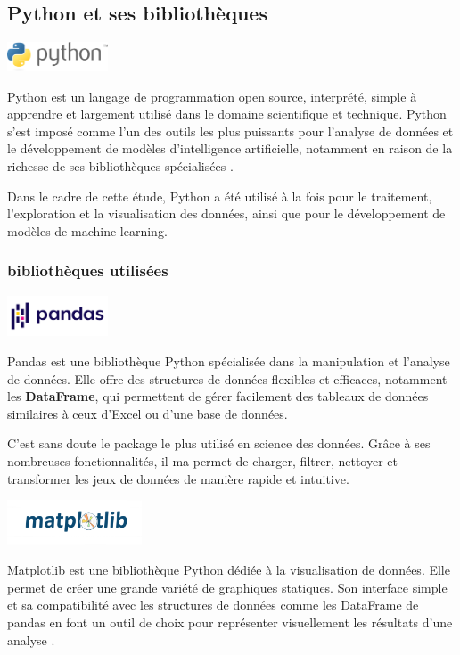 \subsection{Python et ses bibliothèques }

\includegraphics[width=3cm]{images/python.png}

Python est un langage de programmation open source, interprété, 
simple à apprendre et largement utilisé dans le domaine scientifique et technique.
Python s’est imposé comme l’un des outils les plus puissants pour l’analyse de données et le développement de modèles d’intelligence artificielle, 
notamment en raison de la richesse de ses bibliothèques spécialisées \cite{python}.

Dans le cadre de cette étude, Python a été utilisé à la fois pour le traitement, l’exploration et la visualisation des données,
ainsi que pour le développement de modèles de machine learning.

\subsubsection{bibliothèques utilisées}

\includegraphics[width=3cm]{images/Pandas_logo.png}

Pandas est une bibliothèque Python spécialisée dans la manipulation et l’analyse de données. 
Elle offre des structures de données flexibles et efficaces, notamment les \textbf{DataFrame}, 
qui permettent de gérer facilement des tableaux de données similaires à ceux d'Excel ou d'une base de données\cite{pandas}.

C’est sans doute le package le plus utilisé en science des données. Grâce à ses nombreuses fonctionnalités,
il ma permet de charger, filtrer, nettoyer et transformer les jeux de données de manière rapide et intuitive.

\includegraphics[width=4cm]{images/Matplotlib.png}

Matplotlib est une bibliothèque Python dédiée à la visualisation de données. 
Elle permet de créer une grande variété de graphiques statiques. 
Son interface simple et sa compatibilité avec les structures de données 
comme les DataFrame de pandas en font un outil de choix pour représenter visuellement les résultats d’une analyse \cite{matplotlib}.

